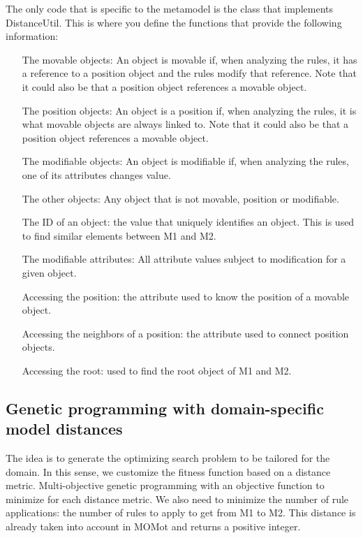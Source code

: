 The only code that is specific to the metamodel is the class that implements DistanceUtil. This is where you define the functions that provide the following information:

\begin{itemize}
	\item[The movable objects:] An object is movable if, when analyzing the rules, it has a reference to a position object and the rules modify that reference. Note that it could also be that a position object references a movable object.
	\item[The position objects:] An object is a position if, when analyzing the rules, it is what movable objects are always linked to. Note that it could also be that a position object references a movable object.
	\item[The modifiable objects:] An object is modifiable if, when analyzing the rules, one of its attributes changes value.
	\item[The other objects:] Any object that is not movable, position or modifiable.
	\item[The ID of an object:] the value that uniquely identifies an object. This is used to find similar elements between M1 and M2.
	\item[The modifiable attributes:] All attribute values subject to modification for a given object.
	\item[Accessing the position:] the attribute used to know the position of a movable object.
	\item[Accessing the neighbors of a position:] the attribute used to connect position objects.
	\item[Accessing the root:] used to find the root object of M1 and M2.
\end{itemize}

\subsection{Genetic programming with domain-specific model distances}


The idea is to generate the optimizing search problem to be tailored for the domain. In this sense, we customize the fitness function based on a distance metric. 
Multi-objective genetic programming with an objective function to minimize for each distance metric.
We also need to minimize the number of rule applications: the number of rules to apply to get from M1 to M2. This distance is already taken into account in MOMot and returns a positive integer.